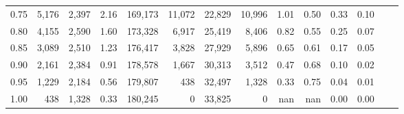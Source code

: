 \begin{tabular}{rrrrrrrrrrrrrr}
0.75 &   5,176 &  2,397 &    2.16 &  169,173 &   11,072 &  22,829 &  10,996 &  1.01 &  0.50 &  0.33 &      0.10 \\
0.80 &   4,155 &  2,590 &    1.60 &  173,328 &    6,917 &  25,419 &   8,406 &  0.82 &  0.55 &  0.25 &      0.07 \\
0.85 &   3,089 &  2,510 &    1.23 &  176,417 &    3,828 &  27,929 &   5,896 &  0.65 &  0.61 &  0.17 &      0.05 \\
0.90 &   2,161 &  2,384 &    0.91 &  178,578 &    1,667 &  30,313 &   3,512 &  0.47 &  0.68 &  0.10 &      0.02 \\
0.95 &   1,229 &  2,184 &    0.56 &  179,807 &      438 &  32,497 &   1,328 &  0.33 &  0.75 &  0.04 &      0.01 \\
1.00 &     438 &  1,328 &    0.33 &  180,245 &        0 &  33,825 &       0 &   nan &   nan &  0.00 &      0.00 \\
\bottomrule
\end{tabular}
